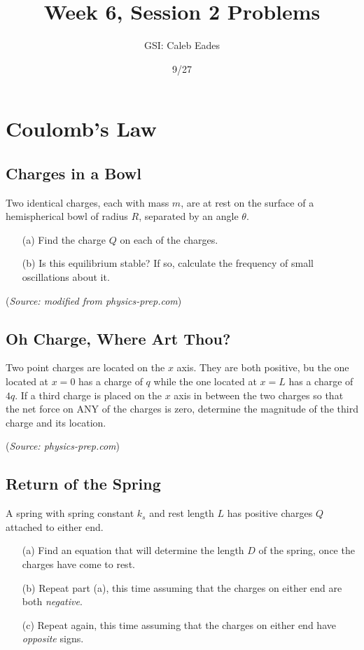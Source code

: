 \documentclass{article}
\begin{document}
\title{Week 6, Session 2 Problems}
\author{GSI: Caleb Eades}
\date{9/27}
\maketitle

\section{Coulomb's Law}

\subsection{Charges in a Bowl}

Two identical charges, each with mass $m$, are at rest on the surface of a hemispherical bowl of radius $R$, separated by an angle $\theta$.
\begin{itemize}
	\item[(a)] Find the charge $Q$ on each of the charges.
	\item[(b)] Is this equilibrium stable? If so, calculate the frequency of small oscillations about it.
\end{itemize}

(\textit{Source: modified from physics-prep.com})

\subsection{Oh Charge, Where Art Thou?}

Two point charges are located on the $x$ axis. They are both positive, bu the one located at $x=0$ has a charge of $q$ while the one located at $x=L$ has a charge of $4q$. If a third charge is placed on the $x$ axis in between the two charges so that the net force on ANY of the charges is zero, determine the magnitude of the third charge and its location.

(\textit{Source: physics-prep.com})

\subsection{Return of the Spring}

A spring with spring constant $k_s$ and rest length $L$ has positive charges $Q$ attached to either end.
\begin{itemize}
	\item[(a)] Find an equation that will determine the length $D$ of the spring, once the charges have come to rest.
	\item[(b)] Repeat part (a), this time assuming that the charges on either end are both \textit{negative}.
	\item[(c)] Repeat again, this time assuming that the charges on either end have \textit{opposite} signs.
\end{itemize}
\end{document}
